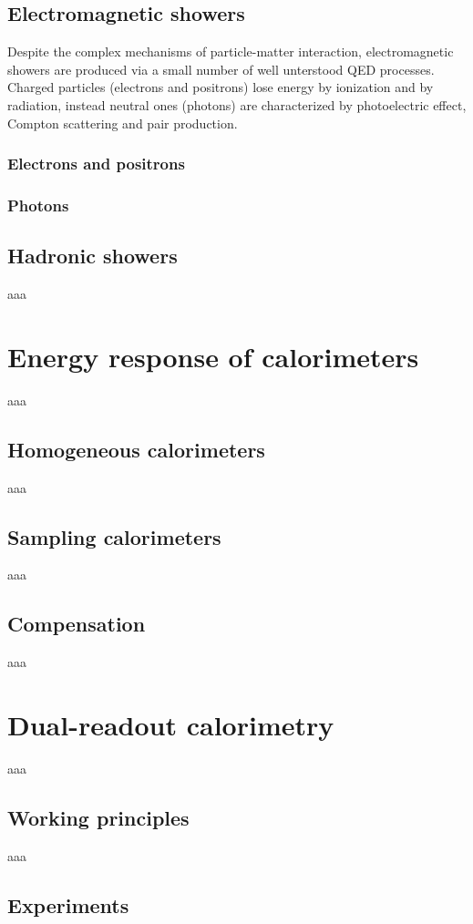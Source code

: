 \subsection{Electromagnetic showers}
Despite the complex mechanisms of particle-matter interaction, electromagnetic showers are produced via a small number of well unterstood QED processes. Charged particles (electrons and positrons) lose energy by ionization and by radiation, instead neutral ones (photons) are characterized by photoelectric effect, Compton scattering and pair production.

\subsubsection*{Electrons and positrons}

\subsubsection*{Photons}

\subsection{Hadronic showers}
aaa

\section{Energy response of calorimeters}
aaa

\subsection{Homogeneous calorimeters}
aaa

\subsection{Sampling calorimeters}
aaa

\subsection{Compensation}
aaa

\section{Dual-readout calorimetry}
aaa

\subsection{Working principles}
aaa

\subsection{Experiments}